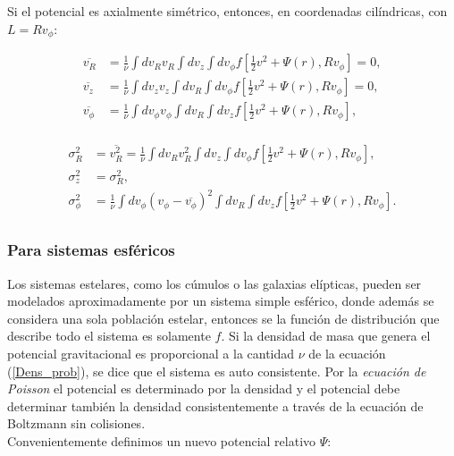 Si el potencial es axialmente simétrico, entonces, en coordenadas cilíndricas, con $L= R v_\phi$:

\begin{equation}
\begin{aligned}
\overline{v_R} &= \frac{1}{\nu} \int d v_R v_R \int d v_z \int d v_\phi f \left [ \frac{1}{2}v^2  + \Psi (r) , R v_\phi \right ] = 0, \\
\overline{v_z} &= \frac{1}{\nu} \int d v_z v_z \int d v_R \int d v_\phi f \left [ \frac{1}{2}v^2  + \Psi (r) , R v_\phi \right ] = 0, \\
\overline{v_\phi} &= \frac{1}{\nu} \int d v_\phi v_\phi \int d v_R \int d v_z f \left [ \frac{1}{2}v^2  + \Psi (r) , R v_\phi \right ], \\
\end{aligned}
\end{equation}


\begin{equation}
\begin{aligned}
\sigma_R^2 &= \overline{v_R^2} = \frac{1}{\nu} \int d v_R v_R^2 \int d v_z \int d v_\phi f \left [ \frac{1}{2}v^2  + \Psi (r) , R v_\phi \right ], \\
\sigma_z^2 &= \sigma_R^2, \\
\sigma_\phi^2 &= \frac{1}{\nu} \int d v_\phi (v_\phi - \overline{v_\phi})^2 \int d v_R \int d v_z f \left [ \frac{1}{2}v^2  + \Psi (r) , R v_\phi \right ]. \\
\end{aligned}
\end{equation}


\subsubsection{Para sistemas esféricos}
Los sistemas estelares, como los cúmulos o las galaxias elípticas, pueden ser modelados aproximadamente por un sistema simple esférico, donde además se considera una sola población estelar, entonces se la función de distribución que describe todo el sistema es solamente $f$. Si la densidad de masa que genera el potencial gravitacional es proporcional a la cantidad $\nu$ de la ecuación (\ref{Dens_prob}), se dice que el sistema es auto consistente. Por la \emph{ecuación de Poisson} el potencial es determinado por la densidad y el potencial debe determinar también la densidad consistentemente a través de la ecuación de Boltzmann sin colisiones.\\

Convenientemente definimos un nuevo potencial relativo $\Psi$:

